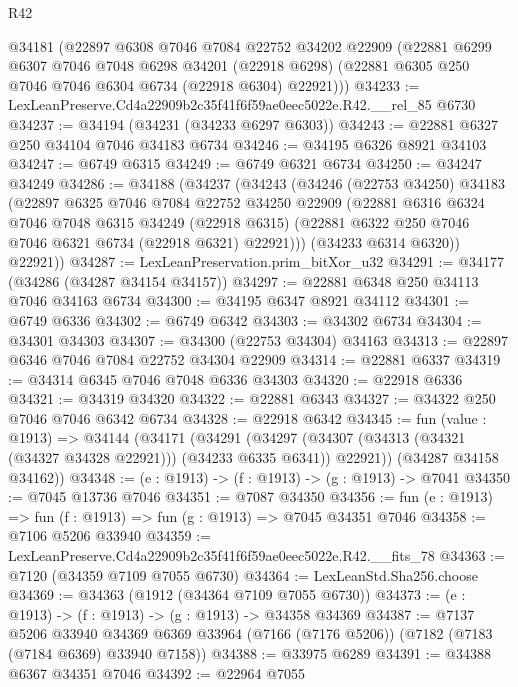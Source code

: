 \begin{lexlean}{R42}
\begin{coremodule}
{    @34181
    (@22897
      @6308
      @7046
      @7084
      @22752
      @34202
      @22909
      (@22881
        @6299
        @6307
        @7046
        @7048
        @6298
        @34201
        (@22918 @6298)
        (@22881 @6305 @250 @7046 @7046 @6304 @6734 (@22918 @6304) @22921)))
@34233 := LexLeanPreserve.Cd4a22909b2c35f41f6f59ae0eec5022e.R42.__rel_85 @6730
@34237 := @34194 (@34231 (@34233 @6297 @6303))
@34243 := @22881 @6327 @250 @34104 @7046 @34183 @6734
@34246 := @34195 @6326 @8921 @34103
@34247 := @6749 @6315
@34249 := @6749 @6321 @6734
@34250 := @34247 @34249
@34286 := @34188
    (@34237
      (@34243
        (@34246
          (@22753 @34250)
          @34183
          (@22897
            @6325
            @7046
            @7084
            @22752
            @34250
            @22909
            (@22881
              @6316
              @6324
              @7046
              @7048
              @6315
              @34249
              (@22918 @6315)
              (@22881 @6322 @250 @7046 @7046 @6321 @6734 (@22918 @6321) @22921)))
          (@34233 @6314 @6320))
        @22921))
@34287 := LexLeanPreservation.prim_bitXor_u32
@34291 := @34177 (@34286 (@34287 @34154 @34157))
@34297 := @22881 @6348 @250 @34113 @7046 @34163 @6734
@34300 := @34195 @6347 @8921 @34112
@34301 := @6749 @6336
@34302 := @6749 @6342
@34303 := @34302 @6734
@34304 := @34301 @34303
@34307 := @34300 (@22753 @34304) @34163
@34313 := @22897 @6346 @7046 @7084 @22752 @34304 @22909
@34314 := @22881 @6337
@34319 := @34314 @6345 @7046 @7048 @6336 @34303
@34320 := @22918 @6336
@34321 := @34319 @34320
@34322 := @22881 @6343
@34327 := @34322 @250 @7046 @7046 @6342 @6734
@34328 := @22918 @6342
@34345 := fun (value : @1913) =>
  @34144
    (@34171
      (@34291
        (@34297 (@34307 (@34313 (@34321 (@34327 @34328 @22921))) (@34233 @6335 @6341)) @22921))
      (@34287 @34158 @34162))
@34348 := (e : @1913) -> (f : @1913) -> (g : @1913) -> @7041
@34350 := @7045 @13736 @7046
@34351 := @7087 @34350
@34356 := fun (e : @1913) => fun (f : @1913) => fun (g : @1913) => @7045 @34351 @7046
@34358 := @7106 @5206 @33940
@34359 := LexLeanPreserve.Cd4a22909b2c35f41f6f59ae0eec5022e.R42.__fits_78
@34363 := @7120 (@34359 @7109 @7055 @6730)
@34364 := LexLeanStd.Sha256.choose
@34369 := @34363 (@1912 (@34364 @7109 @7055 @6730))
@34373 := (e : @1913) -> (f : @1913) -> (g : @1913) -> @34358 @34369
@34387 := @7137
    @5206
    @33940
    @34369
    @6369
    @33964
    (@7166 (@7176 @5206))
    (@7182 (@7183 (@7184 @6369) @33940 @7158))
@34388 := @33975 @6289
@34391 := @34388 @6367 @34351 @7046
@34392 := @22964 @7055
}
\end{coremodule}
\end{lexlean}
